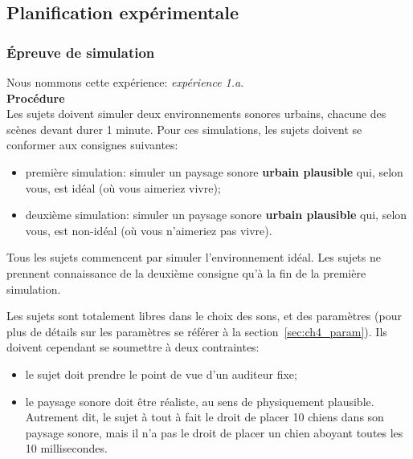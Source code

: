 \subsection{Planification expérimentale}

\subsubsection{Épreuve de simulation}
\label{sec:ch5_planExpSimu}

Nous nommons cette expérience: \emph{expérience 1.a}. \\

{\setlength{\parindent}{0cm}\textbf{Procédure}} \\

Les sujets doivent simuler deux environnements sonores urbains, chacune des scènes devant durer 1 minute. Pour ces simulations, les sujets doivent se conformer aux consignes suivantes:

\begin{itemize}
\item première simulation: simuler un paysage sonore \textbf{urbain plausible} qui, selon vous, est idéal (où vous aimeriez vivre);
\item deuxième simulation: simuler un paysage sonore \textbf{urbain plausible} qui, selon vous, est non-idéal (où vous n'aimeriez pas vivre).
\end{itemize}

Tous les sujets commencent par simuler l'environnement idéal. Les sujets ne prennent connaissance de la deuxième consigne qu'à la fin de la première simulation.

Les sujets sont totalement libres dans le choix des sons, et des paramètres (pour plus de détails sur les paramètres se référer à la section~\ref{sec:ch4_param}). Ils doivent cependant se soumettre à deux contraintes:

\begin{itemize}
\item le sujet doit prendre le point de vue d’un auditeur fixe;

\item le paysage sonore doit être réaliste, au sens de physiquement plausible. Autrement dit, le sujet à tout à fait le droit de placer 10 chiens dans son paysage sonore, mais il n’a pas le droit de placer un chien aboyant toutes les 10 millisecondes.

\end{itemize}

